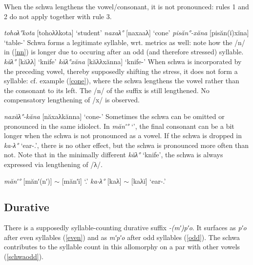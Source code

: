 \documentclass[a4paper, 12pt]{article}
\newcommand{\citeay}[2][]{
   \citeauthor{#2} (\citeyear[#1]{#2})}
\begin{document}
	When the schwa lengthens the vowel/consonant, it is not pronounced: rules 1 and 2 do not apply together with rule 3. 
	
	\pex\label{schwabasic}\a \emph{tohoλ°kota} [tohoλλkota] \hfill `student'
		\a \emph{naxaλ°} [naxaaλ] \hfill `cone'
		\a \emph{pisăn°-xăna} [pisăn(ĭ)xĭna] \hfill `table-{\Ins}'
	\xe
	Schwa forms a legitimate syllable, wrt. metrics as well: note how the /n/ in (\ref{nn}) is longer due to occuring after an odd (and therefore stressed) syllable.
	\pex\label{knife}\a \emph{kăλ°} [kăλλ] \hfill `knife'
		\a\label{nn}\emph{kăλ°xăna} [kăλλxănna] \hfill `knife-{\Ins}'
	\xe
	When schwa is incorporated by the preceding vowel, thereby supposedly shifting the stress, it does not form a syllable: cf. example (\ref{cone}), where the schwa lengthens the vowel rather than the consonant to its left. The /n/ of the suffix is still lengthened. No compensatory lengthening of /x/ is observed.

	\ex\label{cone}\emph{naxăλ°-kăna} [năxaλkănna] \hfill `cone-{\Ins}’ \xe
	Sometimes the schwa can be omitted or pronounced in the same idiolect. In \emph{mănʹ°} `{\Fsg}', the final consonant can be a bit longer when the schwa is not pronounced as a vowel. If the schwa is dropped in \emph{ka-λ°} `ear-{\Poss}.{\Ssg}', there is no other effect, but the schwa is pronounced more often than not. Note that in the minimally different \emph{kăλ°} `knife', the schwa is always expressed via lengthening of /λ/.

	\pex\label{}\a \emph{mănʹ°} [mănʹ(nʹ)] $\sim$ [mănʹĭ] \hfill `{\Fsg}.{\Nom}'
		\a \emph{ka-λ°} [kaλ] $\sim$ [kaλĭ] \hfill `ear-{\Poss}.{\Ssg}'
	\xe
%	

			\subsection{Durative}
			
	There is a supposedly syllable-counting durative suffix \emph{-(mʹ)pʹo}. It surfaces as \emph{pʹo} after even syllables (\ref{even}) and as \emph{mʹpʹo} after odd syllables (\ref{odd}). The schwa contributes to the syllable count in this allomorphy on a par with other vowels (\ref{schwaodd}).
	
\end{document}
